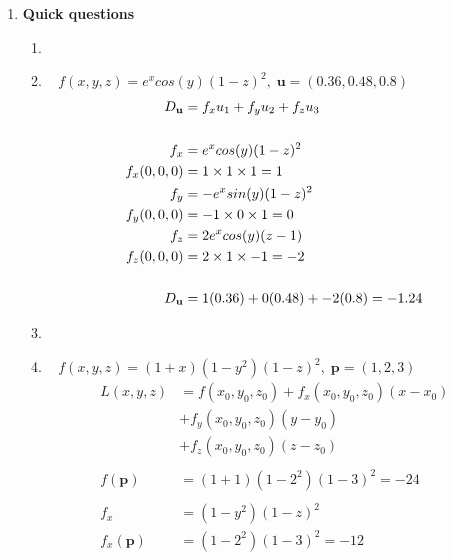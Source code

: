 \documentclass[11pt]{article}
\newcommand\Item[1][]{%
  \ifx\relax#1\relax  \item \else \item[#1] \fi
  \abovedisplayskip=0pt\abovedisplayshortskip=0pt~\vspace*{-\baselineskip}}
\begin{document}
\begin{preview}
\begin{enumerate}
              \newpage
        \item \textbf{Quick questions}
              \begin{enumerate}
                  \Item
                  $f(x,y,z) = e^{x}cos(y)(1-z)^{2}, \; \textbf{u} = (0.36, 0.48, 0.8)$ \\
                  \begin{align*}
                      D_{\textbf{\textbf{u}}} & = f_{x}u_{1} + f_{y}u_{2} + f_{z}u_{3} \\ \\
                      f_{x}                   & = e^{x}cos(y)(1-z)^{2}                 \\
                      f_{x}(0,0,0)            & = 1 \times 1 \times 1 = 1              \\
                      f_{y}                   & = -e^{x}sin(y)(1-z)^2                  \\
                      f_{y}(0,0,0)            & = -1 \times 0 \times 1 = 0             \\
                      f_{z}                   & = 2e^{x}cos(y)(z - 1)                  \\
                      f_{z}(0,0,0)            & = 2 \times 1 \times -1 = -2            \\ \\
                      D_{\textbf{\textbf{u}}} & = 1(0.36) + 0(0.48) + -2(0.8)=-1.24    \\
                  \end{align*}
                  \Item
                  $f(x,y,z) = (1+x)(1-y^2)(1-z)^2, \; \textbf{p} = (1,2,3) $\\
                  \begin{align*}
                      L(x,y,z)          & = f(x_0, y_0, z_0) + f_x(x_0, y_0, z_0)(x-x_0) \\
                                        & + f_y(x_0, y_0, z_0)(y-y_0)                    \\
                                        & + f_z(x_0, y_0, z_0)(z-z_0)                    \\\\
                      f(\textbf{p})     & = (1+1)(1-2^2)(1-3)^2=-24                      \\ \\
                      f_{x}             & = (1-y^2)(1-z)^2                               \\
                      f_{x}(\textbf{p}) & = (1-2^2)(1-3)^2=-12                           \\

\end{align*}
\end{enumerate}
\end{enumerate}
\end{preview}
\end{document}
